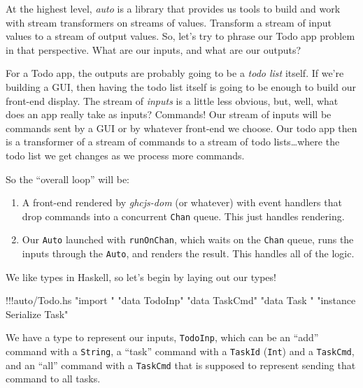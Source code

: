 \documentclass[]{article}
\newenvironment{Shaded}{}{}
\newcommand{\StringTok}[1]{\textcolor[rgb]{0.25,0.44,0.63}{{#1}}}
\newcommand{\FunctionTok}[1]{\textcolor[rgb]{0.02,0.16,0.49}{{#1}}}
\newcommand{\NormalTok}[1]{{#1}}
\begin{document}
At the highest level, \emph{auto} is a library that provides us tools to
build and work with stream transformers on streams of values. Transform
a stream of input values to a stream of output values. So, let's try to
phrase our Todo app problem in that perspective. What are our inputs,
and what are our outputs?

For a Todo app, the outputs are probably going to be a \emph{todo list}
itself. If we're building a GUI, then having the todo list itself is
going to be enough to build our front-end display. The stream of
\emph{inputs} is a little less obvious, but, well, what does an app
really take as inputs? Commands! Our stream of inputs will be commands
sent by a GUI or by whatever front-end we choose. Our todo app then is a
transformer of a stream of commands to a stream of todo
lists\ldots{}where the todo list we get changes as we process more
commands.

So the ``overall loop'' will be:

\begin{enumerate}
\def\labelenumi{\arabic{enumi}.}
\tightlist
\item
  A front-end rendered by \emph{ghcjs-dom} (or whatever) with event
  handlers that drop commands into a concurrent \texttt{Chan} queue.
  This just handles rendering.
\item
  Our \texttt{Auto} launched with \texttt{runOnChan}, which waits on the
  \texttt{Chan} queue, runs the inputs through the \texttt{Auto}, and
  renders the result. This handles all of the logic.
\end{enumerate}

We like types in Haskell, so let's begin by laying out our types!

\begin{Shaded}
\begin{Highlighting}[]
\FunctionTok{!!!}\NormalTok{auto}\FunctionTok{/}\NormalTok{Todo.hs }\StringTok{"import "} \StringTok{"data TodoInp"} \StringTok{"data TaskCmd"} \StringTok{"data Task "} \StringTok{"instance Serialize Task"}
\end{Highlighting}
\end{Shaded}

We have a type to represent our inputs, \texttt{TodoInp}, which can be
an ``add'' command with a \texttt{String}, a ``task'' command with a
\texttt{TaskId} (\texttt{Int}) and a \texttt{TaskCmd}, and an ``all''
command with a \texttt{TaskCmd} that is supposed to represent sending
that command to all tasks.
\end{document}
